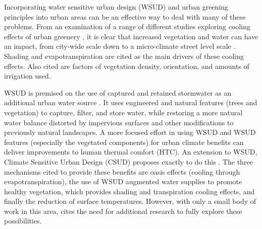 \documentclass[final,3p,times,authoryear]{elsarticle}
\begin{document}
Incorporating water sensitive urban design (WSUD) and urban greening principles into urban areas can be an effective way to deal with many of these problems. From an examination of a range of different studies exploring cooling effects of urban greenery \citep{Tsiros2010,Shashua-Bar2000,Shashua-Bar2010a,Spangenberg2008}, it is clear that increased vegetation and water can have an impact, from city-wide scale down to a micro-climate street level scale \citep{Coutts2012}. Shading and evapotranspiration are cited \citep{Bowler2010} as the main drivers of these cooling effects. Also cited are factors of vegetation density, orientation, and amounts of irrigation used. 

WSUD is premised on the use of captured and retained stormwater as an additional urban water source \citep{Wong2009}. It uses engineered and natural features (trees and vegetation) to capture, filter, and store water, while restoring a more natural water balance distorted by impervious surfaces and other modifications to previously natural landscapes. A more focused effort in using WSUD and WSUD features (especially the vegetated components) for urban climate benefits can deliver improvements to human thermal comfort (HTC). An extension to WSUD, Climate Sensitive Urban Design (CSUD) proposes exactly to do this \citep{Coutts2012}. The three mechanisms cited to provide these benefits are oasis effects (cooling through evapotranspiration), the use of WSUD augmented water supplies to promote healthy vegetation, which provides shading and transpiration cooling effects, and finally the reduction of surface temperatures. However, with only a small body of work in this area, \cite{Coutts2012} cites the need for additional research to fully explore these possibilities. 
\end{document}
